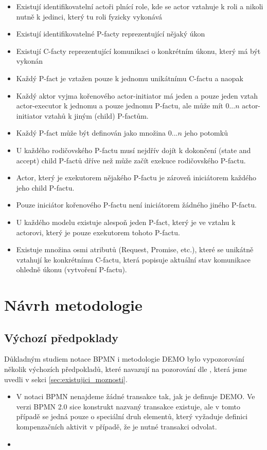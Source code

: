 \documentclass[]{article}
\begin{document}
\begin{itemize}
\item Existují identifikovatelní actoři plnící role, kde se actor vztahuje k roli a nikoli nutně k jedinci, který tu roli fyzicky vykonává
\item Existují identifikovatelné P-facty reprezentující nějaký úkon
\item Existují C-facty reprezentující komunikaci o konkrétním úkonu, který má být vykonán
\item Každý P-fact je vztažen pouze k jednomu unikátnímu C-factu a naopak
\item Každý aktor vyjma kořenového actor-initiator má jeden a pouze jeden vztah actor-executor k jednomu a pouze jednomu P-factu, ale může mít $0...n$ actor-initiator vztahů k jiným (child) P-factům.
\item Každý P-fact může být definován jako množina $0...n$ jeho potomků %
\item U každého rodičovského P-factu musí nejdřív dojít k dokončení (state and accept) child P-factů dříve než může začít exekuce rodičovského P-factu.
\item Actor, který je exekutorem nějakého P-factu je zároveň iniciátorem každého jeho child P-factu.
\item Pouze iniciátor kořenového P-factu není iniciátorem žádného jiného P-factu.
\item U každého modelu existuje alespoň jeden P-fact, který je ve vztahu k actorovi, který je pouze exekutorem tohoto P-factu.
\item Existuje množina osmi atributů (Request, Promise, etc.), které se unikátně vztahují ke konkrétnímu C-factu, která  popisuje aktuální stav komunikace ohledně úkonu (vytvoření P-factu).
\end{itemize}

\section{Návrh metodologie}
\subsection{Výchozí předpoklady}
Důkladným studiem notace BPMN i metodologie DEMO bylo vypozorování několik výchozích předpokladů, které navazují na pozorování dle \cite{VanNuffel2009}, která jsme uvedli v sekci \ref{sec:existujici_moznosti}.

\begin{itemize}
\item V notaci BPMN nenajdeme žádné transakce tak, jak je definuje DEMO. Ve verzi BPMN 2.0 sice konstrukt nazvaný transakce existuje, ale v tomto případě se jedná pouze o speciální druh elementů, který vyžaduje definici kompenzačních aktivit v případě, že je nutné transakci odvolat.
\item
\end{itemize}
\end{document}
